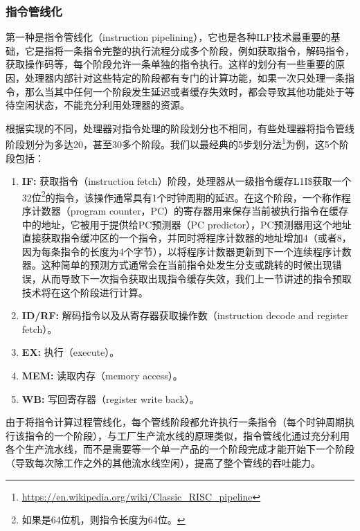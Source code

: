 \subsubsection{指令管线化}
第一种是指令管线化（instruction pipelining），它也是各种ILP技术最重要的基础，它是指将一条指令完整的执行流程分成多个阶段，例如获取指令，解码指令，获取操作码等，每个阶段允许一条单独的指令执行。这样的划分有一些重要的原因，处理器内部针对这些特定的阶段都有专门的计算功能，如果一次只处理一条指令，那么当其中任何一个阶段发生延迟或者缓存失效时，都会导致其他功能处于等待空闲状态，不能充分利用处理器的资源。

根据实现的不同，处理器对指令处理的阶段划分也不相同，有些处理器将指令管线阶段划分为多达20，甚至30多个阶段。我们以最经典的5步划分法\footnote{\url{https://en.wikipedia.org/wiki/Classic_RISC_pipeline}}为例，这5个阶段包括：

\begin{enumerate}
	\item \textbf{IF: } 获取指令（instruction fetch）阶段，处理器从一级指令缓存L1I\$获取一个32位\footnote{如果是64位机，则指令长度为64位。}的指令，该操作通常具有1个时钟周期的延迟。在这个阶段，一个称作程序计数器（program counter，PC）的寄存器用来保存当前被执行指令在缓存中的地址，它被用于提供给PC预测器（PC predictor），PC预测器用这个地址直接获取指令缓冲区的一个指令，并同时将程序计数器的地址增加4（或者8，因为每条指令的长度为4个字节），以将程序计数器更新到下一个连续程序计数器。这种简单的预测方式通常会在当前指令处发生分支或跳转的时候出现错误，从而导致下一次指令获取出现指令缓存失效，我们上一节讲述的指令预取技术将在这个阶段进行计算。
	
	\item \textbf{ID/RF: } 解码指令以及从寄存器获取操作数（instruction decode and register fetch）。
	\item \textbf{EX: } 执行（execute）。
	\item \textbf{MEM: } 读取内存（memory access）。
	\item \textbf{WB: } 写回寄存器（register write back）。
\end{enumerate}


由于将指令计算过程管线化，每个管线阶段都允许执行一条指令（每个时钟周期执行该指令的一个阶段），与工厂生产流水线的原理类似，指令管线化通过充分利用各个生产流水线，而不是需要等一个单一产品的一个阶段完成才能开始下一个阶段（导致每次除工作之外的其他流水线空闲），提高了整个管线的吞吐能力。

